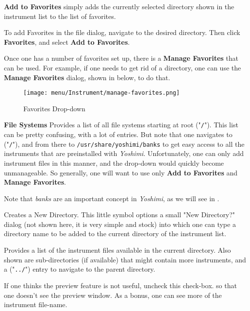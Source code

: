    \textbf{Add to Favorites} 
   simply adds the currently selected directory shown in the instrument list
   to the list of favorites.

   To add Favorites in the file dialog, navigate to the desired directory.
   Then click \textbf{Favorites}, and select \textbf{Add to Favorites}.

   Once one has a number of favorites set up,
   there is a \textbf{Manage Favorites} that can be used.
   For example, if one needs to get rid of a directory, one can use the
   \textbf{Manage Favorites}
   dialog, shown in
    below,
   to do that.

\begin{figure}[H]
   \centering 
   \texttt{[image: menu/Instrument/manage-favorites.png]}
   \caption{Favorites Drop-down}
   \label{fig:manage_instrument_favorites}
\end{figure}

   \textbf{File Systems} 
   Provides a list of all file systems starting at root ("\texttt{/}").
   This list can be pretty confusing, with a lot of entries.
   But note that one navigates to ("\texttt{/}"), and from there to
   \texttt{/usr/share/yoshimi/banks} to get easy access to all the
   instruments that are preinstalled with
   \textsl{Yoshimi}.  Unfortunately, one can only add instrument
   files in this manner, and the drop-down would quickly become
   unmanageable.  So generally, one will want to use only
   \textbf{Add to Favorites} and \textbf{Manage Favorites}.

   Note that \textsl{banks} are an important concept in
   \textsl{Yoshimi}, as we will see in
   .

   Creates a New Directory.
   This little symbol options a small "New Directory?" dialog (not shown
   here, it is very simple and stock) into which one can type a directory
   name to be added to the current directory of the instrument list.

   Provides a list of the instrument files available in the current
   directory.  Also shown are sub-directories (if available)
   that might contain more instruments, and a ("\texttt{../}") entry
   to navigate to the parent directory.

   If one thinks the preview feature is not useful, uncheck this check-box.
   so that one doesn't see the preview window.  As a bonus, one can see more
   of the instrument file-name.

